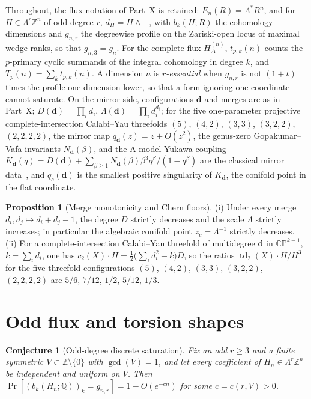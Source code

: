 \documentclass[11pt]{article}
\newtheorem{conjecture}{Conjecture}
\theoremstyle{definition}
\newcommand{\Z}{\mathbb Z}
\providecommand{\Z}{\mathbb Z}
\newtheorem{proposition}{Proposition}
\begin{document}
Throughout, the flux notation of Part~X is retained: $E_n(R)=\Lambda^{*}R^n$, and for $H\in\Lambda^r\Z^n$ of odd degree $r$, $d_H=H\wedge-$, with $b_k(H;R)$ the cohomology dimensions and $g_{n,r}$ the degreewise profile on the Zariski-open locus of maximal wedge ranks, so that $g_{n,3}=g_n$.  For the complete flux $H^{(n)}_\Delta$, $t_{p,k}(n)$ counts the $p$-primary cyclic summands of the integral cohomology in degree $k$, and $T_p(n)=\sum_kt_{p,k}(n)$.  A dimension $n$ is \emph{$r$-essential} when $g_{n,r}$ is not $(1+t)$ times the profile one dimension lower, so that a form ignoring one coordinate cannot saturate.  On the mirror side, configurations $\mathbf d$ and merges are as in Part~X; $D(\mathbf d)=\prod_id_i$, $\Lambda(\mathbf d)=\prod_id_i^{d_i}$; for the five one-parameter projective complete-intersection Calabi--Yau threefolds $(5)$, $(4,2)$, $(3,3)$, $(3,2,2)$, $(2,2,2,2)$, the mirror map $q_{\mathbf d}(z)=z+O(z^2)$, the genus-zero Gopakumar--Vafa invariants $N_{\mathbf d}(\beta)$, and the A-model Yukawa coupling $K_{\mathbf d}(q)=D(\mathbf d)+\sum_{\beta\ge1}N_{\mathbf d}(\beta)\beta^3q^\beta/(1-q^\beta)$ are the classical mirror data~\cite{HKTY95}, and $q_c(\mathbf d)$ is the smallest positive singularity of $K_{\mathbf d}$, the conifold point in the flat coordinate.

\begin{proposition}[Merge monotonicity and Chern floors]\label{ad:merge}
(i) Under every merge $d_i,d_j\mapsto d_i+d_j-1$, the degree $D$ strictly decreases and the scale $\Lambda$ strictly increases; in particular the algebraic conifold point $z_c=\Lambda^{-1}$ strictly decreases.  (ii) For a complete-intersection Calabi--Yau threefold of multidegree $\mathbf d$ in $\mathbb{CP}^{k-1}$, $k=\sum_id_i$, one has $c_2(X)\cdot H=\tfrac12\bigl(\sum_id_i^2-k\bigr)D$, so the ratios $\operatorname{td}_2(X)\cdot H/H^3$ for the five threefold configurations $(5)$, $(4,2)$, $(3,3)$, $(3,2,2)$, $(2,2,2,2)$ are $5/6$, $7/12$, $1/2$, $5/12$, $1/3$.
\end{proposition}

\section{Odd flux and torsion shapes}

\begin{conjecture}[Odd-degree discrete saturation]\label{ad1}
Fix an odd $r\ge3$ and a finite symmetric $V\subset\Z\setminus\{0\}$ with $\gcd(V)=1$, and let every coefficient of $H_n\in\Lambda^r\Z^n$ be independent and uniform on $V$.  Then $\Pr[(b_k(H_n;\mathbb Q))_k=g_{n,r}]=1-O(e^{-cn})$ for some $c=c(r,V)>0$.
\end{conjecture}
\end{document}

